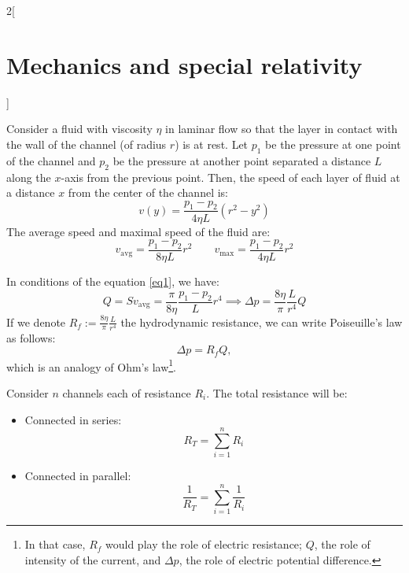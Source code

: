 \documentclass[../../../main.tex]{subfiles}
\begin{document}
\begin{multicols}{2}[\section{Mechanics and special relativity}]
\begin{prop}[Viscosity]
    \end{prop}
    \begin{center}
        \begin{minipage}{\linewidth}
            \centering
            
        \end{minipage}
    \end{center}
    \begin{prop}
        Consider a fluid with viscosity $\eta$ in laminar flow so that the layer in contact with the wall of the channel (of radius $r$) is at rest. Let $p_1$ be the pressure at one point of the channel and $p_2$ be the pressure at another point separated a distance $L$ along the $x$-axis from the previous point. Then, the speed of each layer of fluid at a distance $x$ from the center of the channel is:
        $$v(y)=\frac{p_1-p_2}{4\eta L}(r^2-y^2)$$ The average speed and maximal speed of the fluid are:
        \begin{equation}
            v_\text{avg}=\frac{p_1-p_2}{8\eta L}r^2\qquad v_\text{max}=\frac{p_1-p_2}{4\eta L}r^2
            \label{eq1}
        \end{equation}
    \end{prop}
    \begin{prop}
        In conditions of the equation \eqref{eq1}, we have: $$Q=Sv_\text{avg}=\frac{\pi}{8\eta }\frac{p_1-p_2}{L}r^4\implies\Delta p=\frac{8\eta}{\pi}\frac{L}{r^4}Q$$ If we denote $\displaystyle R_f:=\frac{8\eta}{\pi}\frac{L}{r^4}$ the hydrodynamic resistance, we can write Poiseuille's law as follows: $$\Delta p=R_f Q,$$ which is an analogy of Ohm's law\footnote{In that case, $R_f$ would play the role of electric resistance; $Q$, the role of intensity of the current, and $\Delta p$, the role of electric potential difference.}.
    \end{prop}
    \begin{prop}
        Consider $n$ channels each of resistance $R_i$. The total resistance will be:
        \begin{itemize}
            \item Connected in series: $$R_T=\sum_{i=1}^nR_i$$
            \item Connected in parallel: $$\frac{1}{R_T}=\sum_{i=1}^n\frac{1}{R_i}$$
        \end{itemize}
    \end{prop}

\end{multicols}
\end{document}
